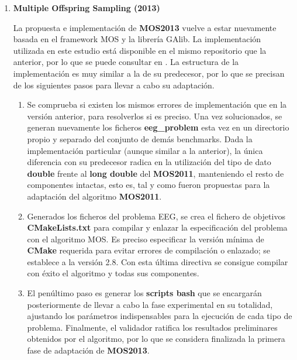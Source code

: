 \begin{enumerate}
	\item \textbf{Multiple Offspring Sampling (2013)}
	
	La propuesta e implementación de \textbf{MOS2013}\cite{MOS2013,MOS-Algorithms} vuelve a estar nuevamente basada en el framework MOS\cite{MOS-Framework} y la librería GAlib\cite{GALib}. La implementación utilizada en este estudio está disponible en el mismo repositorio que la anterior, por lo que se puede consultar en \cite{MOS-Algorithms}. La estructura de la implementación es muy similar a la de su predecesor, por lo que se precisan de los siguientes pasos para llevar a cabo su adaptación.
	
	\begin{enumerate}
		\item Se comprueba si existen los mismos errores de implementación que en la versión anterior, para resolverlos si es preciso. Una vez solucionados, se generan nuevamente los ficheros \textbf{eeg\_problem} esta vez en un directorio propio y separado del conjunto de demás benchmarks. Dada la implementación particular (aunque similar a la anterior), la única diferencia con su predecesor radica en la utilización del tipo de dato \textbf{double} frente al \textbf{long double} del \textbf{MOS2011}, manteniendo el resto de componentes intactas, esto es, tal y como fueron propuestas para la adaptación del algoritmo \textbf{MOS2011}.
		
		\item Generados los ficheros del problema EEG, se crea el fichero de objetivos \textbf{CMakeLists.txt} para compilar y enlazar la especificación del problema con el algoritmo MOS. Es preciso especificar la versión mínima de \textbf{CMake} requerida para evitar errores de compilación o enlazado; se establece a la versión 2.8. Con esta última directiva se consigue compilar con éxito el algoritmo y todas sus componentes. 
		
		\item El penúltimo paso es generar los \textbf{scripts bash} que se encargarán posteriormente de llevar a cabo la fase experimental en su totalidad, ajustando los parámetros indispensables para la ejecución de cada tipo de problema. Finalmente, el validador ratifica los resultados preliminares obtenidos por el algoritmo, por lo que se considera finalizada la primera fase de adaptación de \textbf{MOS2013}.
	\end{enumerate}


\end{enumerate}
